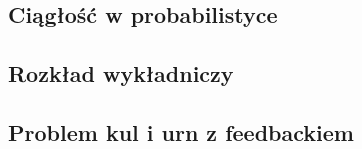 \subsection{Ciągłość w probabilistyce}


\subsection{Rozkład wykładniczy}


\subsection{Problem kul i urn z feedbackiem}
